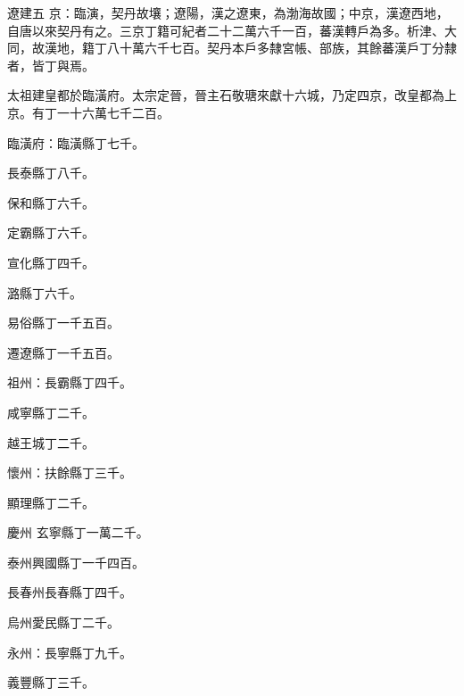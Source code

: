 
\begin{pinyinscope}

 遼建五
 京：臨演，契丹故壤；遼陽，漢之遼東，為渤海故國；中京，漢遼西地，自唐以來契丹有之。三京丁籍可紀者二十二萬六千一百，蕃漢轉戶為多。析津、大同，故漢地，籍丁八十萬六千七百。契丹本戶多隸宮帳、部族，其餘蕃漢戶丁分隸者，皆丁與焉。



 太祖建皇都於臨潢府。太宗定晉，晉主石敬瑭來獻十六城，乃定四京，改皇都為上京。有丁一十六萬七千二百。



 臨潢府：臨潢縣丁七千。



 長泰縣丁八千。



 保和縣丁六千。



 定霸縣丁六千。



 宣化縣丁四千。



 潞縣丁六千。



 易俗縣丁一千五百。



 遷遼縣丁一千五百。



 祖州：長霸縣丁四千。



 咸寧縣丁二千。



 越王城丁二千。



 懷州：扶餘縣丁三千。



 顯理縣丁二千。



 慶州
 玄寧縣丁一萬二千。



 泰州興國縣丁一千四百。



 長春州長春縣丁四千。



 烏州愛民縣丁二千。



 永州：長寧縣丁九千。



 義豐縣丁三千。




\end{pinyinscope}
